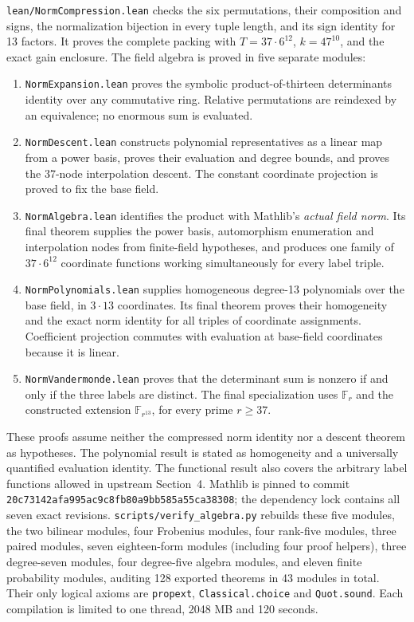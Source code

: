 \documentclass[11pt]{article}
\begin{document}
\texttt{lean/NormCompression.lean} checks the six permutations, their
composition and signs, the normalization bijection in every tuple
length, and its sign identity for 13 factors. It proves the complete
packing with \(T=37\cdot6^{12}\), \(k=47^{10}\), and the exact gain
enclosure. The field algebra is proved in five separate modules:
\begin{enumerate}
\item \texttt{NormExpansion.lean} proves the symbolic product-of-thirteen
determinants identity over any commutative ring. Relative permutations
are reindexed by an equivalence; no enormous sum is evaluated.
\item \texttt{NormDescent.lean} constructs polynomial representatives
as a linear map from a power basis, proves their evaluation and degree
bounds, and proves the 37-node interpolation descent. The constant
coordinate projection is proved to fix the base field.
\item \texttt{NormAlgebra.lean} identifies the product with Mathlib's
\emph{actual field norm}. Its final theorem supplies the power basis,
automorphism enumeration and interpolation nodes from finite-field
hypotheses, and produces one family of \(37\cdot6^{12}\) coordinate
functions working simultaneously for every label triple.
\item \texttt{NormPolynomials.lean} supplies homogeneous degree-13
polynomials over the base field, in \(3\cdot13\) coordinates. Its final
theorem proves their homogeneity and the exact norm identity for all
triples of coordinate assignments. Coefficient projection commutes
with evaluation at base-field coordinates because it is linear.
\item \texttt{NormVandermonde.lean} proves that the determinant sum
is nonzero if and only if the three labels are distinct. The final
specialization uses \(\mathbb F_r\) and the constructed extension
\(\mathbb F_{r^{13}}\), for every prime \(r\ge37\).
\end{enumerate}
These proofs assume neither the compressed norm identity nor a descent
theorem as hypotheses. The polynomial result is stated as homogeneity
and a universally quantified evaluation identity. The functional
result also covers the arbitrary label functions allowed in upstream
Section~4. Mathlib is pinned to commit
\texttt{20c73142afa995ac9c8fb80a9bb585a55ca38308};
the dependency lock contains all seven exact revisions.
\texttt{scripts/verify\_algebra.py} rebuilds these five modules, the
two bilinear modules, four Frobenius modules, four rank-five modules,
three paired modules, seven eighteen-form modules (including four proof helpers), three degree-seven modules,
four degree-five algebra modules, and eleven finite probability modules,
auditing 128 exported theorems in 43 modules in total. Their only logical
axioms are \texttt{propext}, \texttt{Classical.choice} and
\texttt{Quot.sound}. Each compilation is limited to one thread,
2048 MB and 120 seconds.
\end{document}

